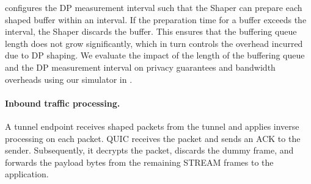 {\sys} configures the DP measurement interval such that the Shaper can prepare each shaped buffer within an interval.
If the preparation time for a buffer exceeds the interval, the Shaper discards the buffer.
This ensures that the buffering queue length does not grow significantly, which in turn controls the overhead incurred due to DP shaping.
We evaluate the impact of the length of the buffering queue and the DP
measurement interval on privacy guarantees and bandwidth overheads using our simulator in .

\paragraph{Inbound traffic processing.}
A tunnel endpoint receives shaped packets from the tunnel and applies inverse
processing on each packet.
QUIC receives the packet and
sends an ACK to the sender. Subsequently, it decrypts the packet, discards the
dummy frame, and forwards the payload bytes from the remaining STREAM frames to
the application.

